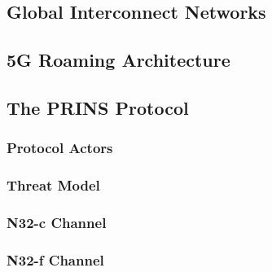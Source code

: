 \subsection{Global Interconnect Networks}
\subsection{5G Roaming Architecture}
\subsection{The PRINS Protocol}
\subsubsection{Protocol Actors}
\subsubsection{Threat Model}
\subsubsection{N32-c Channel}
\subsubsection{N32-f Channel}
